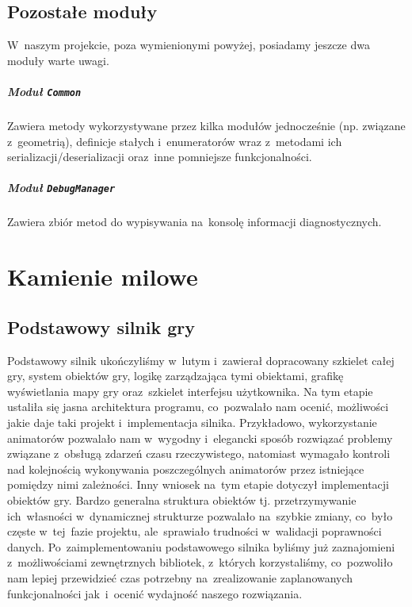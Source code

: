 \documentclass[licencjacka]{pracamgr}
\begin{document}
  \section{Pozostałe moduły}
    W~naszym projekcie, poza wymienionymi powyżej, posiadamy jeszcze dwa moduły warte uwagi.
    \paragraph{Moduł \texttt{Common}}
      Zawiera metody wykorzystywane przez kilka modułów jednocześnie (np. związane z~geometrią), definicje stałych i~enumeratorów
      wraz z~metodami ich serializacji/deserializacji oraz~inne pomniejsze funkcjonalności.
    \paragraph{Moduł \texttt{DebugManager}}
      Zawiera zbiór metod do wypisywania na~konsolę informacji diagnostycznych.

  \chapter{Kamienie milowe}
    \section{Podstawowy silnik gry}
    Podstawowy silnik ukończyliśmy w~lutym i~zawierał dopracowany szkielet całej gry, system obiektów gry,
    logikę zarządzająca tymi obiektami, grafikę wyświetlania mapy gry oraz~szkielet interfejsu użytkownika.
    Na tym etapie ustaliła się jasna architektura programu, co~pozwalało nam ocenić, możliwości jakie
    daje taki projekt i~implementacja silnika. Przykładowo, wykorzystanie animatorów pozwalało nam w~wygodny
    i~elegancki sposób rozwiązać problemy związane z~obsługą zdarzeń czasu rzeczywistego, natomiast wymagało kontroli
    nad kolejnością wykonywania poszczególnych animatorów przez istniejące pomiędzy nimi zależności. Inny wniosek
    na~tym etapie dotyczył implementacji obiektów gry. Bardzo generalna struktura obiektów tj. przetrzymywanie
    ich~własności w~dynamicznej strukturze pozwalało na~szybkie zmiany, co~było częste w~tej~fazie projektu,
    ale~sprawiało trudności w~walidacji poprawności danych.
    Po~zaimplementowaniu podstawowego silnika byliśmy już zaznajomieni z~możliwościami zewnętrznych bibliotek,
    z~których korzystaliśmy, co~pozwoliło nam lepiej przewidzieć czas potrzebny na~zrealizowanie zaplanowanych
    funkcjonalności jak~i~ocenić wydajność naszego rozwiązania.
\end{document}
